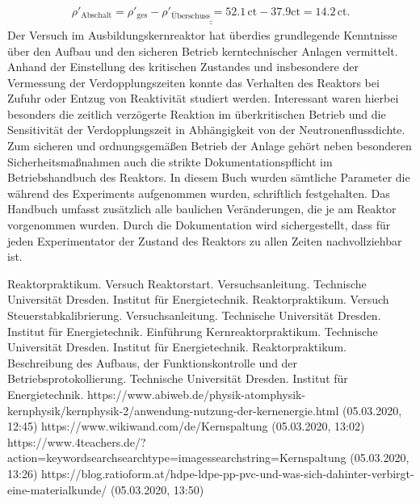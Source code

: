 \documentclass[german,  %
parskip=full,  %
]{scrartcl}
\begin{document}
\begin{align*}
\underline{\underline{\rho'_{\mathrm{Abschalt}} = \rho'_{\mathrm{ges}} - \rho'_{\mathrm{Überschuss}} = 52.1\,\mathrm{ct} - 37.9\mathrm{ct} = 14.2\,\mathrm{ct}.}}
\end{align*}
Der Versuch im Ausbildungskernreaktor hat überdies grundlegende Kenntnisse über den Aufbau und den sicheren Betrieb kerntechnischer Anlagen vermittelt. Anhand der Einstellung des kritischen Zustandes und insbesondere der Vermessung der Verdopplungszeiten konnte das Verhalten des Reaktors bei Zufuhr oder Entzug von Reaktivität studiert werden. Interessant waren hierbei besonders die zeitlich verzögerte Reaktion im überkritischen Betrieb und die Sensitivität der Verdopplungszeit in Abhängigkeit von der Neutronenflussdichte. Zum sicheren und ordnungsgemäßen Betrieb der Anlage gehört neben besonderen Sicherheitsmaßnahmen auch die strikte Dokumentationspflicht im Betriebshandbuch des Reaktors. In diesem Buch wurden sämtliche Parameter die während des Experiments aufgenommen wurden, schriftlich festgehalten. Das Handbuch umfasst zusätzlich alle baulichen Veränderungen, die je am Reaktor vorgenommen wurden. Durch die Dokumentation wird sichergestellt, dass für jeden Experimentator der Zustand des Reaktors zu allen Zeiten nachvollziehbar ist.
    \begin{thebibliography}{9}
    Reaktorpraktikum. Versuch Reaktorstart. Versuchsanleitung. Technische Universität Dresden. Institut für Energietechnik.
    Reaktorpraktikum. Versuch Steuerstabkalibrierung. Versuchsanleitung. Technische Universität Dresden. Institut für           Energietechnik.
    Einführung Kernreaktorpraktikum. Technische Universität Dresden. Institut für           Energietechnik.
    Reaktorpraktikum. Beschreibung des Aufbaus, der Funktionskontrolle und der Betriebsprotokollierung. Technische Universität Dresden. Institut für Energietechnik.
    https://www.abiweb.de/physik-atomphysik-kernphysik/kernphysik-2/anwendung-nutzung-der-kernenergie.html (05.03.2020,      12:45)
   https://www.wikiwand.com/de/Kernspaltung (05.03.2020, 13:02)
  https://www.4teachers.de/?action=keywordsearchsearchtype=imagessearchstring=Kernspaltung (05.03.2020, 13:26)
https://blog.ratioform.at/hdpe-ldpe-pp-pvc-und-was-sich-dahinter-verbirgt-eine-materialkunde/ (05.03.2020, 13:50)


    \end{thebibliography}

\end{document}
